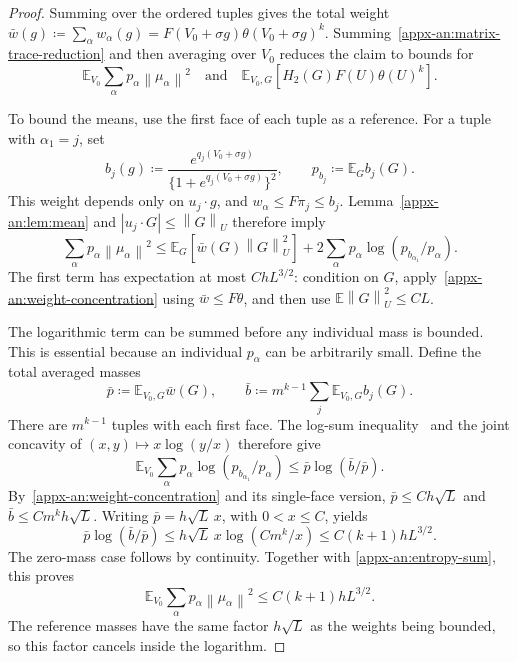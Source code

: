 \documentclass[11pt,letterpaper]{article}
\theoremstyle{remark}
\newcommand{\E}{\mathbb E}
\newcommand{\norm}[1]{\left\lVert#1\right\rVert}
\begin{document}
\begin{proof}
Summing over the ordered tuples gives the total weight
\(\bar w(g)\coloneqq \sum_\alpha w_\alpha(g)
=F(V_0+\sigma g)\theta(V_0+\sigma g)^k\).
Summing~\eqref{appx-an:matrix-trace-reduction} and then averaging over
\(V_0\) reduces the claim to bounds for
\[
 \E_{V_0}\sum_\alpha p_\alpha\norm{\mu_\alpha}^2
 \quad\text{and}\quad
 \E_{V_0,G}[H_2(G)F(U)\theta(U)^k].
\]

To bound the means, use the first face of each tuple as a reference.
For a tuple with \(\alpha_1=j\), set
\[
 b_j(g)\coloneqq \frac{e^{q_j(V_0+\sigma g)}}
                  {\{1+e^{q_j(V_0+\sigma g)}\}^2},
 \qquad p_{b_j}\coloneqq \E_Gb_j(G).
\]
This weight depends only on \(u_j\cdot g\), and
\(w_\alpha\le F\pi_j\le b_j\). Lemma~\ref{appx-an:lem:mean}
and \(|u_j\cdot G|\le\norm G_U\) therefore imply
\begin{equation}
 \sum_\alpha p_\alpha\norm{\mu_\alpha}^2
 \le\E_G[\bar w(G)\norm G_U^2]
       +2\sum_\alpha p_\alpha\log(p_{b_{\alpha_1}}/p_\alpha).
 \label{appx-an:entropy-sum}
\end{equation}
The first term has expectation at most \(ChL^{3/2}\): condition on
\(G\), apply~\eqref{appx-an:weight-concentration} using
\(\bar w\le F\theta\), and then use \(\E\norm G_U^2\le CL\).

The logarithmic term can be summed before any individual mass is
bounded. This is essential because an individual \(p_\alpha\) can
be arbitrarily small. Define the total averaged masses
\[
 \bar p\coloneqq \E_{V_0,G}\bar w(G),\qquad
 \bar b\coloneqq m^{k-1}\sum_j\E_{V_0,G}b_j(G).
\]
There are \(m^{k-1}\) tuples with each first face. The log-sum
inequality~\cite[Theorem~2.7.1]{CoverThomas2006} and the joint concavity
of \((x,y)\mapsto x\log(y/x)\)
therefore give
\[
 \E_{V_0}\sum_\alpha p_\alpha
          \log(p_{b_{\alpha_1}}/p_\alpha)
 \le\bar p\log(\bar b/\bar p).
\]
By~\eqref{appx-an:weight-concentration} and its single-face version,
\(\bar p\le Ch\sqrt L\) and \(\bar b\le Cm^kh\sqrt L\).
Writing \(\bar p=h\sqrt L\,x\), with \(0<x\le C\), yields
\[
 \bar p\log(\bar b/\bar p)
 \le h\sqrt L\,x\log(Cm^k/x)
 \le C(k+1)hL^{3/2}.
\]
The zero-mass case follows by continuity. Together with
\eqref{appx-an:entropy-sum}, this proves
\begin{equation}
 \E_{V_0}\sum_\alpha p_\alpha\norm{\mu_\alpha}^2
 \le C(k+1)hL^{3/2}.
 \label{appx-an:tilted-mean-bound}
\end{equation}
The reference masses have the same factor \(h\sqrt L\) as the
weights being bounded, so this factor cancels inside the logarithm.


\end{proof}
\end{document}

